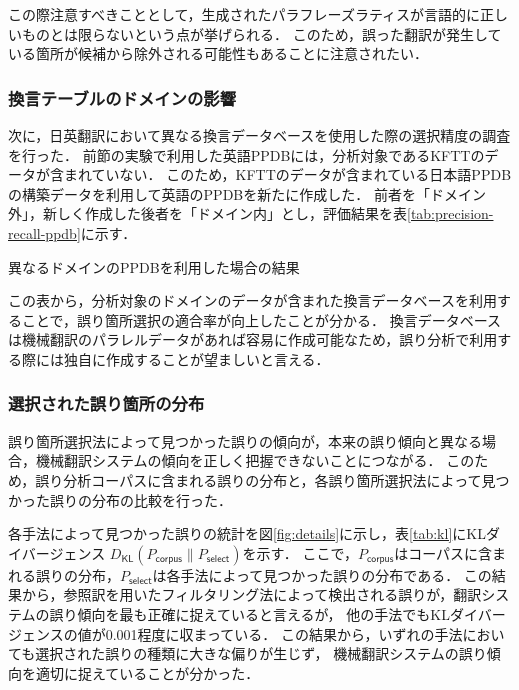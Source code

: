 \documentclass[japanese]{jnlp_1.4}
\begin{document}
この際注意すべきこととして，生成されたパラフレーズラティスが言語的に正しいものとは限らないという点が挙げられる．
このため，誤った翻訳が発生している箇所が候補から除外される可能性もあることに注意されたい．


\subsubsection{換言テーブルのドメインの影響}

次に，日英翻訳において異なる換言データベースを使用した際の選択精度の調査を行った．
前節の実験で利用した英語PPDBには，分析対象であるKFTTのデータが含まれていない．
このため，KFTTのデータが含まれている日本語PPDBの構築データを利用して英語のPPDBを新たに作成した．
前者を「ドメイン外」，新しく作成した後者を「ドメイン内」とし，評価結果を表\ref{tab:precision-recall-ppdb}に示す．

\begin{table}[b]
\caption{異なるドメインのPPDBを利用した場合の結果}
\label{tab:precision-recall-ppdb}

\end{table}

この表から，分析対象のドメインのデータが含まれた換言データベースを利用することで，誤り箇所選択の適合率が向上したことが分かる．
換言データベースは機械翻訳のパラレルデータがあれば容易に作成可能なため\cite{bannard05paraphrase}，誤り分析で利用する際には独自に作成することが望ましいと言える．


\subsubsection{選択された誤り箇所の分布}

誤り箇所選択法によって見つかった誤りの傾向が，本来の誤り傾向と異なる場合，機械翻訳システムの傾向を正しく把握できないことにつながる．
このため，誤り分析コーパスに含まれる誤りの分布と，各誤り箇所選択法によって見つかった誤りの分布の比較を行った．

各手法によって見つかった誤りの統計を図\ref{fig:details}に示し，表\ref{tab:kl}にKLダイバージェンス\cite{kullback1951} $D_{\mathsf{KL}}(P_{\mathsf{corpus}} \| P_{\mathsf{select}})$を示す．
ここで，$P_{\textsf{corpus}}$はコーパスに含まれる誤りの分布，$P_{\textsf{select}}$は各手法によって見つかった誤りの分布である．
この結果から，参照訳を用いたフィルタリング法によって検出される誤りが，翻訳システムの誤り傾向を最も正確に捉えていると言えるが，
他の手法でもKLダイバージェンスの値が0.001程度に収まっている．
この結果から，いずれの手法においても選択された誤りの種類に大きな偏りが生じず，
機械翻訳システムの誤り傾向を適切に捉えていることが分かった．
\end{document}
